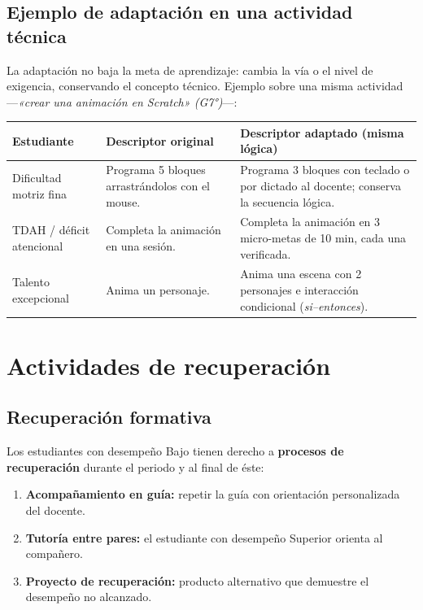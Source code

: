 \documentclass[12pt, a4paper]{article}
\begin{document}
\subsection{Ejemplo de adaptación en una actividad técnica}

La adaptación no baja la meta de aprendizaje: cambia la vía o el nivel de
exigencia, conservando el concepto técnico. Ejemplo sobre una misma actividad
—\textit{«crear una animación en Scratch» (G7°)}—:

\begin{center}
\footnotesize
\setlength{\tabcolsep}{4pt}
\begin{tabular}{|L{3.6cm}|L{5cm}|L{5cm}|}
\hline
{}
\color{white}\textbf{Estudiante} &
\color{white}\textbf{Descriptor original} &
\color{white}\textbf{Descriptor adaptado (misma lógica)} \\
\hline
Dificultad motriz fina & Programa 5 bloques arrastrándolos con el mouse. & Programa 3 bloques con teclado o por dictado al docente; conserva la secuencia lógica. \\
\hline
TDAH / déficit atencional & Completa la animación en una sesión. & Completa la animación en 3 micro-metas de 10 min, cada una verificada. \\
\hline
Talento excepcional & Anima un personaje. & Anima una escena con 2 personajes e interacción condicional (\textit{si–entonces}). \\
\hline
\end{tabular}
\end{center}

\section{Actividades de recuperación}

\subsection{Recuperación formativa}

Los estudiantes con desempeño Bajo tienen derecho a \textbf{procesos de recuperación}
durante el periodo y al final de éste:

\begin{enumerate}
  \item \textbf{Acompañamiento en guía:} repetir la guía con orientación personalizada del docente.
  \item \textbf{Tutoría entre pares:} el estudiante con desempeño Superior orienta al compañero.
  \item \textbf{Proyecto de recuperación:} producto alternativo que demuestre el desempeño no alcanzado.
\end{enumerate}
\end{document}
